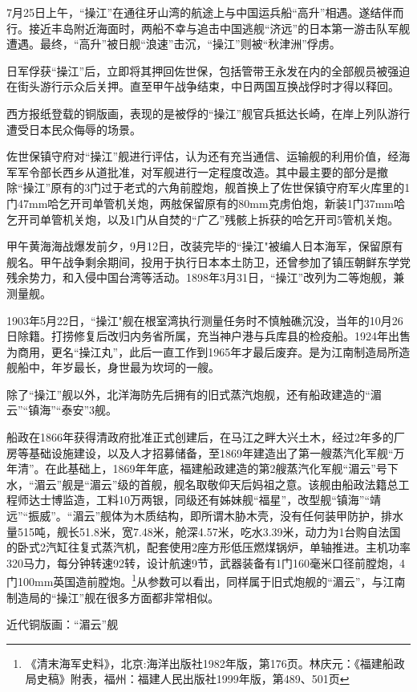\documentclass[12pt,UTF8]{ctexbook}
\begin{document}
7月25日上午，“操江”在通往牙山湾的航途上与中国运兵船“高升”相遇。遂结伴而行。接近丰岛附近海面时，两船不幸与追击中国逃舰“济远”的日本第一游击队军舰遭遇。最终，“高升”被日舰“浪速”击沉，“操江”则被“秋津洲”俘虏。

日军俘获“操江”后，立即将其押回佐世保，包括管带王永发在内的全部舰员被强迫在街头游行示众后关押。直至甲午战争结束，中日两国互换战俘时才得以释回。

西方报纸登载的铜版画，表现的是被俘的“操江”舰官兵抵达长崎，在岸上列队游行遭受日本民众侮辱的场景。

佐世保镇守府对“操江”舰进行评估，认为还有充当通信、运输舰的利用价值，经海军军令部长西乡从道批准，对军舰进行一定程度改造。其中最主要的部分是撤除“操江”原有的3门过于老式的六角前膛炮，舰首换上了佐世保镇守府军火库里的1门47mm哈乞开司单管机关炮，两舷保留原有的80mm克虏伯炮，新装1门37mm哈乞开司单管机关炮，以及1门从自焚的“广乙”残骸上拆获的哈乞开司5管机关炮。

甲午黄海海战爆发前夕，9月12日，改装完毕的“操江"被编人日本海军，保留原有舰名。甲午战争剩余期间，投用于执行日本本土防卫，还曾参加了镇压朝鲜东学党残余势力，和入侵中国台湾等活动。1898年3月31日，“操江”改列为二等炮舰，兼测量舰。

1903年5月22日，“操江"舰在根室湾执行测量任务时不慎触礁沉没，当年的10月26日除籍。打捞修复后改归内务省所属，充当神户港与兵库县的检疫船。1924年出售为商用，更名“操江丸”，此后一直工作到1965年才最后废弃。是为江南制造局所造舰船中，年岁最长，身世最为坎坷的一艘。

除了“操江”舰以外，北洋海防先后拥有的旧式蒸汽炮舰，还有船政建造的“湄云”“镇海”“泰安”3舰。

船政在1866年获得清政府批准正式创建后，在马江之畔大兴土木，经过2年多的厂房等基础设施建设，以及人才招募储备，至1869年建造出了第一艘蒸汽化军舰“万年清”。在此基础上，1869年年底，福建船政建造的第2艘蒸汽化军舰“湄云”号下水，“湄云”舰是“湄云”级的首舰，舰名取敬仰天后妈祖之意。该舰由船政法籍总工程师达士博监造，工料10万两银，同级还有姊妹舰“福星”，改型舰“镇海”“靖远”“振威”。“湄云”舰体为木质结构，即所谓木胁木壳，没有任何装甲防护，排水量515吨，舰长51.8米，宽7.48米，舱深4.57米，吃水3.39米，动力为1台购自法国的卧式2汽缸往复式蒸汽机，配套使用2座方形低压燃煤锅炉，单轴推进。主机功率320马力，每分钟转速92转，设计航速9节，武器装备有1门160毫米口径前膛炮，4门100mm英国造前膛炮。\footnote{《清末海军史料》，北京:海洋出版社1982年版，第176页。林庆元：《福建船政局史稿》附表，福州：福建人民出版社1999年版，第489、501页}从参数可以看出，同样属于旧式炮舰的“湄云”，与江南制造局的“操江”舰在很多方面都非常相似。

近代铜版画：“湄云”舰
\end{document}
